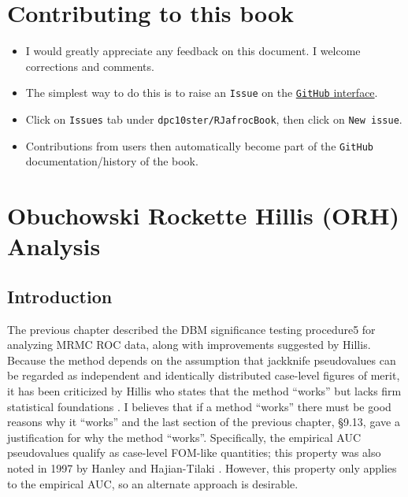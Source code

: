 \documentclass[
]{book}
\providecommand{\tightlist}{%
  \setlength{\itemsep}{0pt}\setlength{\parskip}{0pt}}
\begin{document}
\hypertarget{contributing-to-this-book}{%
\chapter*{Contributing to this book}\label{contributing-to-this-book}}

\begin{itemize}
\tightlist
\item
  I would greatly appreciate any feedback on this document. I welcome corrections and comments.\\
\item
  The simplest way to do this is to raise an \texttt{Issue} on the \href{https://github.com/dpc10ster/RJafrocBook}{\texttt{GitHub} interface}.
\item
  Click on \texttt{Issues} tab under \texttt{dpc10ster/RJafrocBook}, then click on \texttt{New\ issue}.
\item
  Contributions from users then automatically become part of the \texttt{GitHub} documentation/history of the book.
\end{itemize}

\hypertarget{ORHAnalysis}{%
\chapter{Obuchowski Rockette Hillis (ORH) Analysis}\label{ORHAnalysis}}

\hypertarget{introduction}{%
\section{Introduction}\label{introduction}}

The previous chapter described the DBM significance testing procedure5 for analyzing MRMC ROC data, along with improvements suggested by Hillis. Because the method depends on the assumption that jackknife pseudovalues can be regarded as independent and identically distributed case-level figures of merit, it has been criticized by Hillis who states that the method ``works'' but lacks firm statistical foundations \citep{RN1772, RN1865, RN1866}. I believes that if a method ``works'' there must be good reasons why it ``works'' and the last section of the previous chapter, §9.13, gave a justification for why the method ``works''. Specifically, the empirical AUC pseudovalues qualify as case-level FOM-like quantities; this property was also noted in 1997 by Hanley and Hajian-Tilaki \citep{RN1395}. However, this property only applies to the empirical AUC, so an alternate approach is desirable.
\end{document}
